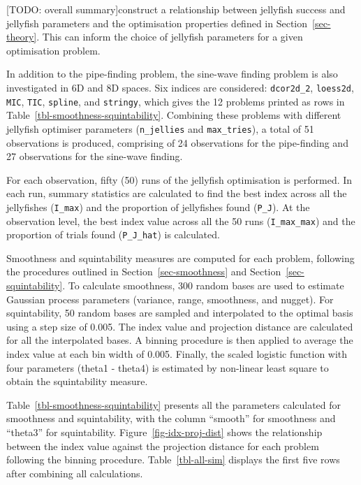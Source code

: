 \documentclass[
  number,
  preprint,
  3p]{elsarticle}
\begin{document}
{[}TODO: overall summary{]}construct a relationship between jellyfish
success and jellyfish parameters and the optimisation properties defined
in Section~\ref{sec-theory}. This can inform the choice of jellyfish
parameters for a given optimisation problem.

In addition to the pipe-finding problem, the sine-wave finding problem
is also investigated in 6D and 8D spaces. Six indices are considered:
\texttt{dcor2d\_2}, \texttt{loess2d}, \texttt{MIC}, \texttt{TIC},
\texttt{spline}, and \texttt{stringy}, which gives the 12 problems
printed as rows in Table~\ref{tbl-smoothness-squintability}. Combining
these problems with different jellyfish optimiser parameters
(\texttt{n\_jellies} and \texttt{max\_tries}), a total of 51
observations is produced, comprising of 24 observations for the
pipe-finding and 27 observations for the sine-wave finding.

For each observation, fifty (50) runs of the jellyfish optimisation is
performed. In each run, summary statistics are calculated to find the
best index across all the jellyfishes (\texttt{I\_max}) and the
proportion of jellyfishes found (\texttt{P\_J}). At the observation
level, the best index value across all the 50 runs
(\texttt{I\_max\_max}) and the proportion of trials found
(\texttt{P\_J\_hat}) is calculated.

Smoothness and squintability measures are computed for each problem,
following the procedures outlined in Section~\ref{sec-smoothness} and
Section~\ref{sec-squintability}. To calculate smoothness, 300 random
bases are used to estimate Gaussian process parameters (variance, range,
smoothness, and nugget). For squintability, 50 random bases are sampled
and interpolated to the optimal basis using a step size of 0.005. The
index value and projection distance are calculated for all the
interpolated bases. A binning procedure is then applied to average the
index value at each bin width of 0.005. Finally, the scaled logistic
function with four parameters (theta1 - theta4) is estimated by
non-linear least square to obtain the squintability measure.

Table~\ref{tbl-smoothness-squintability} presents all the parameters
calculated for smoothness and squintability, with the column ``smooth''
for smoothness and ``theta3'' for squintability.
Figure~\ref{fig-idx-proj-dist} shows the relationship between the index
value against the projection distance for each problem following the
binning procedure. Table~\ref{tbl-all-sim} displays the first five rows
after combining all calculations.
\end{document}
